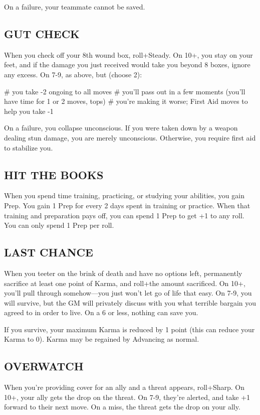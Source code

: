 On a failure, your teammate cannot be saved.


\subsection{GUT CHECK}
When you check off your 8th wound box, roll+Steady. On 10+, you stay on your feet, and if the damage you just received would take you beyond 8 boxes, ignore any excess. On 7-9, as above, but (choose 2):

\begin{easylist}
# you take -2 ongoing to all moves
# you’ll pass out in a few moments (you’ll have time for 1 or 2 moves, tops)
# you’re making it worse; First Aid moves to help you take -1
\end{easylist}

On a failure, you collapse unconscious. If you were taken down by a weapon dealing stun damage, you are merely unconscious. Otherwise, you require first aid to stabilize you.


\subsection{HIT THE BOOKS}
When you spend time training, practicing, or studying your abilities, you gain Prep. You gain 1 Prep for every 2 days spent in training or practice. When that training and preparation pays off, you can spend 1 Prep to get +1 to any roll. You can only spend 1 Prep per roll.


\subsection{LAST CHANCE}
When you teeter on the brink of death and have no options left, permanently sacrifice at least one point of Karma, and roll+the amount sacrificed. On 10+, you’ll pull through somehow—you just won’t let go of life that easy. On 7-9, you will survive, but the GM will privately discuss with you what terrible bargain you agreed to in order to live. On a 6 or less, nothing can save you.

If you survive, your maximum Karma is reduced by 1 point (this can reduce your Karma to 0). Karma may be regained by Advancing as normal.


\subsection{OVERWATCH}
When you’re providing cover for an ally and a threat appears, roll+Sharp. On 10+, your ally gets the drop on the threat. On 7-9, they’re alerted, and take +1 forward to their next move. On a miss, the threat gets the drop on your ally.


